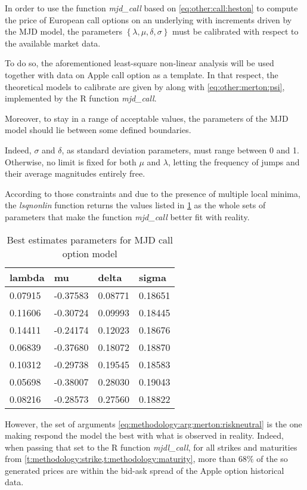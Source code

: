 \documentclass[12pt,a4paper]{report}
\begin{document}
In order to use the function \textit{mjd\_call} based on \cref{eq:other:call:heston} to compute the price of European call options on an underlying with increments driven by the MJD model, the parameters $\left\{ \lambda, \mu, \delta ,\sigma \right\}$ must be calibrated with respect to the available market data.

To do so, the aforementioned least-square non-linear analysis will be used together with data on Apple call option as a template.
In that respect, the theoretical models to calibrate are given by  along with \cref{eq:other:merton:psi}, implemented by the R function \textit{mjd\_call}.

Moreover, to stay in a range of acceptable values, the parameters of the MJD model should lie between some defined boundaries. 

Indeed, $\sigma$ and $\delta$, as standard deviation parameters, must range between 0 and 1. 
Otherwise, no limit is fixed for both $\mu$ and $\lambda$, letting the frequency of jumps and their average magnitudes entirely free.

According to those constraints and due to the presence of multiple local minima, the \textit{lsqnonlin} function returns the values listed in \cref{t:methodology:call:merton:estimate1} as the whole sets of parameters that make the function \textit{mjd\_call} better fit with reality.

\begin{table}[h]
\centering
\begin{tabular}{llll}
  \hline
lambda & mu & delta & sigma \\ 
  \hline
0.07915 & -0.37583 & 0.08771 & 0.18651 \\ 
  0.11606 & -0.30724 & 0.09993 & 0.18445 \\ 
  0.14411 & -0.24174 & 0.12023 & 0.18676 \\ 
  0.06839 & -0.37680 & 0.18072 & 0.18870 \\ 
  0.10312 & -0.29738 & 0.19545 & 0.18583 \\ 
  0.05698 & -0.38007 & 0.28030 & 0.19043 \\ 
  0.08216 & -0.28573 & 0.27560 & 0.18822 \\ 
   \hline
\end{tabular}
\caption{Best estimates parameters for MJD call option model} 
\label{t:methodology:call:merton:estimate1}
\end{table}

However, the set of arguments \ref{eq:methodology:arg:merton:riskneutral} is the one making respond the model the best with what is observed in reality.
Indeed, when passing that set to the R function \textit{mjdl\_call}, for all strikes and maturities from \cref{t:methodology:strike,t:methodology:maturity}, more than $68\%$ of the so generated prices are within the bid-ask spread of the Apple option historical data.
\end{document}
